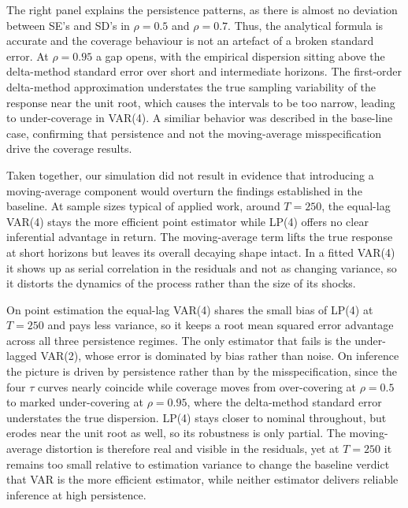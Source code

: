 The right panel explains the persistence patterns, as there is almost no deviation between SE's and SD's in $\rho = 0.5$ and $\rho = 0.7$.
Thus, the analytical formula is accurate and the coverage behaviour is not an artefact of a broken standard 
error. At $\rho = 0.95$ a gap opens, with the empirical dispersion sitting above the delta-method 
standard error over short and intermediate horizons. The first-order delta-method approximation 
understates the true sampling variability of the response near the unit root, which causes the intervals to 
be too narrow, leading to under-coverage in VAR(4). A similiar behavior was described in the base-line case, 
confirming that persistence and not the moving-average misspecification drive the coverage results.



Taken together, our simulation did not result in evidence that introducing a moving-average 
component would overturn the findings established in the baseline. At sample sizes typical of 
applied work, around $T = 250$, the equal-lag VAR(4) 
stays the more efficient point estimator while LP(4) offers no clear inferential advantage in 
return. The moving-average term lifts the true response at short horizons but leaves its overall 
decaying shape intact. In a fitted VAR(4) it shows up as serial correlation in the residuals 
and not as changing variance, so it distorts the dynamics of the process rather than the 
size of its shocks.

On point estimation the equal-lag VAR(4) 
shares the small bias of LP(4) at $T = 250$ and pays less variance, so it keeps a root mean 
squared error advantage across all three persistence regimes. The only estimator that 
fails is the under-lagged VAR(2), whose error is dominated by bias rather than noise. On inference 
the picture is driven by persistence rather than by the misspecification, since the four $\tau$ 
curves nearly coincide while coverage moves from over-covering at $\rho = 0.5$ to marked 
under-covering at $\rho = 0.95$, where the delta-method standard error understates the true 
dispersion. LP(4) stays closer to nominal throughout, but erodes near the unit root as well, so 
its robustness is only partial. The moving-average distortion is therefore real and visible in 
the residuals, yet at $T = 250$ it remains too small relative to estimation variance to change the 
baseline verdict that VAR is the more efficient estimator, while neither estimator delivers 
reliable inference at high persistence.




\FloatBarrier